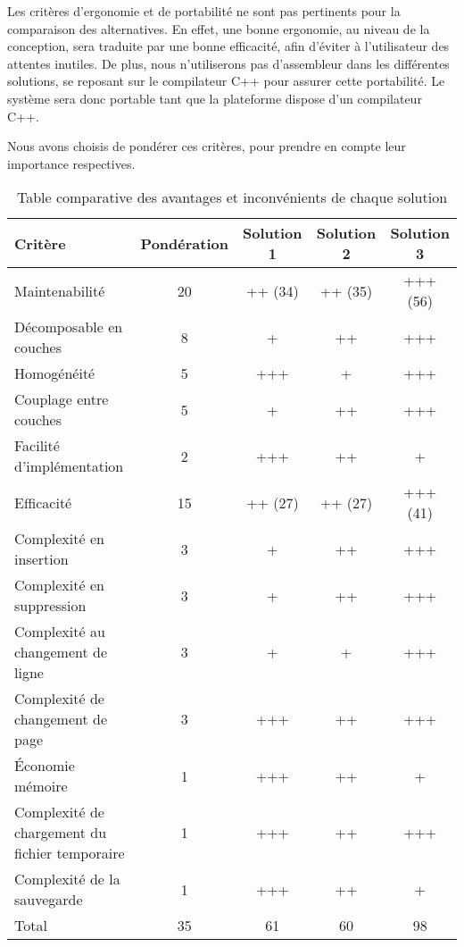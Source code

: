 Les critères d'ergonomie et de portabilité ne sont pas pertinents pour la
comparaison des alternatives.
En effet, une bonne ergonomie, au niveau de la conception, sera traduite par une
bonne efficacité, afin d'éviter à l'utilisateur des attentes inutiles.
De plus, nous n'utiliserons pas d'assembleur dans les différentes solutions, se
reposant sur le compilateur C++ pour assurer cette portabilité. Le système sera
donc portable tant que la plateforme dispose d'un compilateur C++.

Nous avons choisis de pondérer ces critères, pour prendre en compte leur
importance respectives.

\begin{table}[H]
	\centering
	\begin{tabular}{l c|c|c|c}
		Critère & Pondération & Solution 1 & Solution 2 & Solution 3 \\
		\hline \hline
		Maintenabilité & 20 & ++ (34) & ++ (35) & +++ (56) \\
		\hline
		Décomposable en couches & 8 & + & ++ & +++ \\
		Homogénéité & 5 & +++ & + & +++ \\
		Couplage entre couches & 5 & + & ++ & +++ \\
		Facilité d'implémentation & 2 & +++ & ++ & + \\
		\hline \hline
		Efficacité & 15 & ++ (27) & ++ (27) & +++ (41) \\
		\hline
		Complexité en insertion & 3 & + & ++ & +++ \\
		Complexité en suppression & 3 & + & ++ & +++ \\
		Complexité au changement de ligne & 3 & + & + & +++ \\
		Complexité de changement de page & 3 & +++ & ++ & +++ \\
		Économie mémoire & 1 & +++ & ++ & + \\
		Complexité de chargement du fichier temporaire & 1 & +++ & ++ & +++ \\
		Complexité de la sauvegarde & 1 & +++ & ++ & + \\
		\hline
		Total & 35 & 61 & 60 & 98 \\
	\end{tabular}
	\vspace{0.5cm}
	\caption{Table comparative des avantages et inconvénients de chaque solution}
\end{table}



